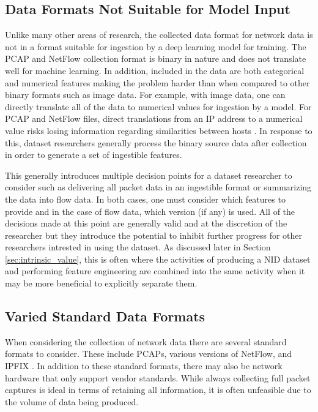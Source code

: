 \documentclass[sigconf, anonymous, screen, review]{acmart}
\begin{document}
\subsection{Data Formats Not Suitable for Model Input}\label{subsec:collectionformat}
Unlike many other areas of research, the collected data format for network data is not in a format suitable for ingestion by a deep learning model for training.
The PCAP and NetFlow collection format is binary in nature and does not translate well for machine learning.
In addition, included in the data are both categorical and numerical features making the problem harder than when compared to other binary formats such as image data. 
For example, with image data, one can directly translate all of the data to numerical values for ingestion by a model.
For PCAP and NetFlow files, direct translations from an IP address to a numerical value risks losing information regarding similarities between hosts \cite{ringip2vec}.
In response to this, dataset researchers generally process the binary source data after collection in order to generate a set of ingestible features.

This generally introduces multiple decision points for a dataset researcher to consider such as delivering all packet data in an ingestible format or summarizing the data into flow data. 
In both cases, one must consider which features to provide and in the case of flow data, which version (if any) is used.
All of the decisions made at this point are generally valid and at the discretion of the researcher but they introduce the potential to inhibit further progress for other researchers intrested in using the dataset.
As discussed later in Section \ref{sec:intrinsic_value}, this is often where the activities of producing a NID dataset and performing feature engineering are combined into the same activity when it may be more beneficial to explicitly separate them.

\subsection{Varied Standard Data Formats}\label{subsec:nostandard}
When considering the collection of network data there are several standard formats to consider.
These include PCAPs, various versions of NetFlow, and IPFIX \cite{claise2008specification}.
In addition to these standard formats, there may also be network hardware that only support vendor standards.
While always collecting full packet captures is ideal in terms of retaining all information, it is often unfeasible due to the volume of data being produced.
\end{document}

